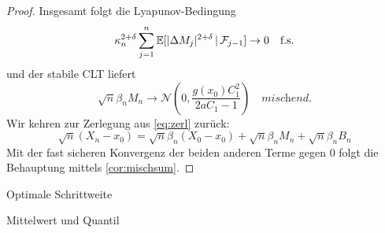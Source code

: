 \documentclass[ngerman,a4paper,11pt]{scrartcl}
\newcommand{\EE}{\mathbb{E}}
\newcommand{\ff}{\mathcal{F}}
\newcommand{\nn}{\mathcal{N}}
\newcommand{\condexp}[2]{\EE[#1\,|\,#2]}
\DeclarePairedDelimiter{\abs}{\lvert}{\rvert}		%
\begin{document}
\begin{proof}
Insgesamt folgt die Lyapunov-Bedingung
\begin{equation*}
  \kappa_n^{2+\delta} \sum_{j=1}^n\condexp{\abs{\Delta M_j}^{2+\delta}}{\ff_{j-1}}\to 0\quad\text{f.s.}
\end{equation*}
und der stabile CLT liefert
\begin{equation*}
 \sqrt{n}\beta_nM_n\to\nn\left( 0,\frac{g(x_0)C_1^2}{2aC_1-1} \right)\quad\textit{mischend.}
\end{equation*}
Wir kehren zur Zerlegung aus \cref{eq:zerl} zurück:
\begin{equation*}
 \sqrt{n}(X_n-x_0)=\sqrt{n}\beta_n(X_0-x_0) +\sqrt{n}\beta_nM_n+\sqrt{n}\beta_nB_n
\end{equation*}
Mit der fast sicheren Konvergenz der beiden anderen Terme gegen $0$ folgt die Behauptung mittels \cref{cor:mischsum}.
\end{proof}
\begin{rem}
 Optimale Schrittweite 
\end{rem}
\begin{exmp}
 Mittelwert und Quantil 
\end{exmp}
\printbibliography
\end{document}
